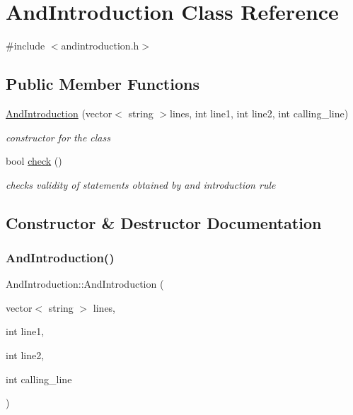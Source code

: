 \hypertarget{class_and_introduction}{}\section{And\+Introduction Class Reference}
\label{class_and_introduction}


{\ttfamily \#include $<$andintroduction.\+h$>$}

\subsection*{Public Member Functions}
\begin{DoxyCompactItemize}
\item 
\mbox{\hyperlink{class_and_introduction_a01c611b95b5a3bef2c52ed928da1ca13}{And\+Introduction}} (vector$<$ string $>$lines, int line1, int line2, int calling\+\_\+line)
\begin{DoxyCompactList}\small\item\em constructor for the class \end{DoxyCompactList}\item 
bool \mbox{\hyperlink{class_and_introduction_a419e921533af2cd185770ec03ddf8fc5}{check}} ()
\begin{DoxyCompactList}\small\item\em checks validity of statements obtained by and introduction rule \end{DoxyCompactList}\end{DoxyCompactItemize}


\subsection{Constructor \& Destructor Documentation}
\mbox{\label{class_and_introduction_a01c611b95b5a3bef2c52ed928da1ca13}} 
\subsubsection{\texorpdfstring{And\+Introduction()}{AndIntroduction()}}
{\footnotesize\ttfamily And\+Introduction\+::\+And\+Introduction (\begin{DoxyParamCaption}\item[{vector$<$ string $>$}]{lines,  }\item[{int}]{line1,  }\item[{int}]{line2,  }\item[{int}]{calling\+\_\+line }\end{DoxyParamCaption})\hspace{0.3cm}{\ttfamily [inline]}}




